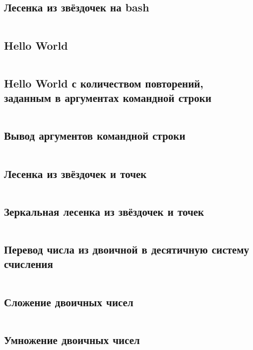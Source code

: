 
\subsection{Лесенка из звёздочек на bash}
\inputminted{bash}{src/star_ladder.sh}

\subsection{Hello World}
\inputminted{c}{src/hello_world.c}

\subsection{Hello World с количеством повторений, заданным в аргументах командной строки}
\inputminted{c}{src/hello_world_with_arguments.c}

\subsection{Вывод аргументов командной строки}
\inputminted{c}{src/arguments_list.c}

\subsection{Лесенка из звёздочек и точек}
\inputminted{c}{src/star_ladder.c}

\subsection{Зеркальная лесенка из звёздочек и точек}
\inputminted{c}{src/star_triangle.c}

\subsection{Перевод числа из двоичной в десятичную систему счисления}
\inputminted{c}{src/to_dec.c}

\subsection{Сложение двоичных чисел}
\inputminted{c}{src/add_bin.c}

\subsection{Умножение двоичных чисел}
\inputminted{c}{src/mul_bin.c}

